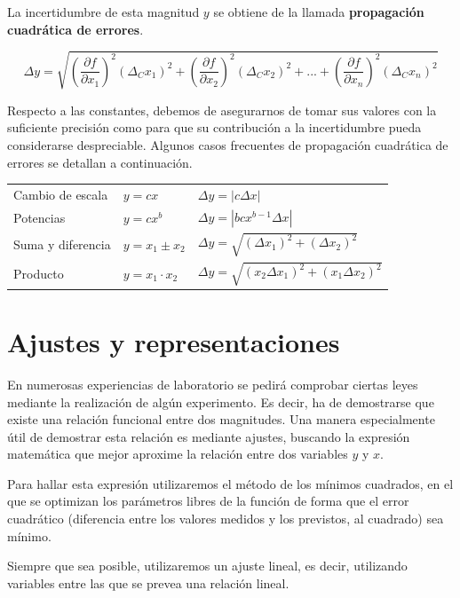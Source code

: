 \documentclass{book}
\begin{document}
La incertidumbre de esta magnitud $y$ se obtiene de la llamada \textbf{propagación cuadrática de 
errores}.

\begin{equation}
  \Delta y = \sqrt{ \left( \frac{\partial f}{\partial x_1} \right)^2 (\Delta_C x_1)^2 + 
  \left( \frac{\partial f}{\partial x_2} \right)^2 (\Delta_C x_2)^2 + ... +
  \left( \frac{\partial f}{\partial x_n} \right)^2 (\Delta_C x_n)^2}
\end{equation}

Respecto a las constantes, debemos de asegurarnos de tomar sus valores con la suficiente precisión
como para que su contribución a la incertidumbre pueda considerarse despreciable. Algunos casos
frecuentes de propagación cuadrática de errores se detallan a continuación.

\begin{center}
  \renewcommand{\arraystretch}{1.75}
  \begin{tabular}{lll}
    Cambio de escala & $y = c x$ & $\Delta y = | c \Delta x |$  \\
    Potencias & $y = c x^b$ & $\Delta y = | b c x^{b-1} \Delta x|$ \\
    Suma y diferencia & $y = x_1 \pm x_2$ & $\Delta y = \sqrt{(\Delta x_1)^2 + (\Delta x_2)^2}$ \\
    Producto & $y = x_1 \cdot x_2$ & $\Delta y = \sqrt{(x_2 \Delta x_1)^2 + (x_1 \Delta x_2)^2}$ \\ 
  \end{tabular} 
\end{center}


\section{Ajustes y representaciones}

En numerosas experiencias de laboratorio se pedirá comprobar ciertas leyes mediante la realización
de algún experimento. Es decir, ha de demostrarse que existe una relación funcional entre dos
magnitudes. Una manera especialmente útil de demostrar esta relación es mediante ajustes, buscando
la expresión matemática que mejor aproxime la relación entre dos variables $y$ y $x$.

Para hallar esta expresión utilizaremos el método de los mínimos cuadrados, en el que se optimizan
los parámetros libres de la función de forma que el error cuadrático (diferencia entre los valores
medidos y los previstos, al cuadrado) sea mínimo.

Siempre que sea posible, utilizaremos un ajuste lineal, es decir, utilizando variables entre las
que se prevea una relación lineal. 
\end{document}
